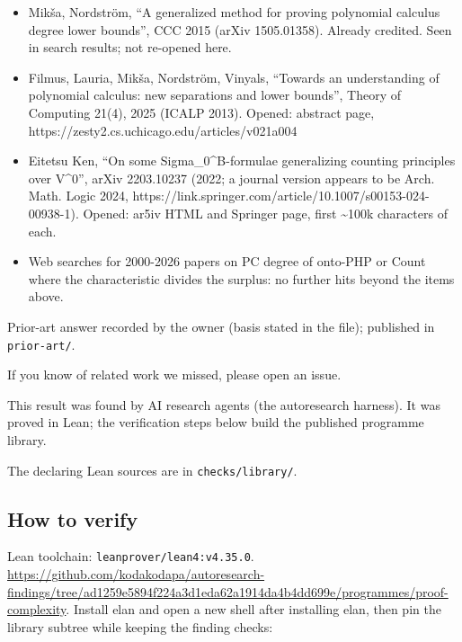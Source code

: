 \documentclass{article}
\begin{document}
\begin{itemize}
\item Mikša, Nordström, ``A generalized method for proving polynomial calculus degree lower bounds'', CCC 2015 (arXiv 1505.01358). Already credited. Seen in search results; not re-opened here.
\item Filmus, Lauria, Mikša, Nordström, Vinyals, ``Towards an understanding of polynomial calculus: new separations and lower bounds'', Theory of Computing 21(4), 2025 (ICALP 2013). Opened: abstract page, https://zesty2.cs.uchicago.edu/articles/v021a004
\item Eitetsu Ken, ``On some Sigma\_0\textasciicircum{}B-formulae generalizing counting principles over V\textasciicircum{}0'', arXiv 2203.10237 (2022; a journal version appears to be Arch. Math. Logic 2024, https://link.springer.com/article/10.1007/s00153-024-00938-1). Opened: ar5iv HTML and Springer page, first \textasciitilde{}100k characters of each.
\item Web searches for 2000-2026 papers on PC degree of onto-PHP or Count where the characteristic divides the surplus: no further hits beyond the items above.
\end{itemize}

Prior-art answer recorded by the owner (basis stated in the file); published in \texttt{prior-art/}.

If you know of related work we missed, please open an issue.

This result was found by AI research agents (the autoresearch harness). It was proved in Lean; the verification steps below build the published programme library.

The declaring Lean sources are in \texttt{checks/library/}.

\subsection*{How to verify}

Lean toolchain: \texttt{leanprover/lean4:v4.35.0}. \url{https://github.com/kodakodapa/autoresearch-findings/tree/ad1259e5894f224a3d1eda62a1914da4b4dd699e/programmes/proof-complexity}. Install elan and open a new shell after installing elan, then pin the library subtree while keeping the finding checks:
\end{document}
